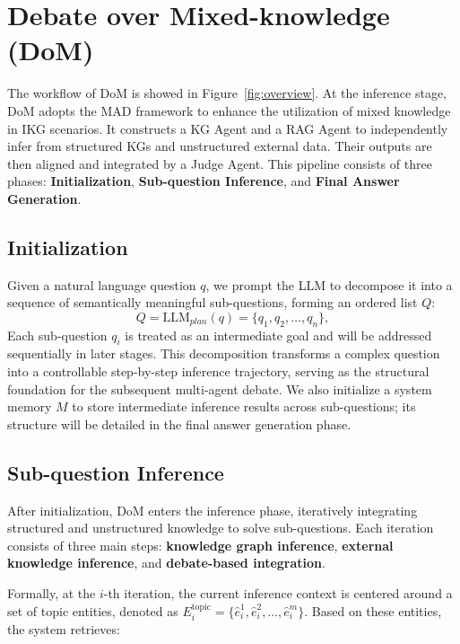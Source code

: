 


\section{Debate over Mixed-knowledge (DoM)} 

The workflow of DoM is showed in Figure~\ref{fig:overview}. At the inference stage, DoM adopts the MAD framework to enhance the utilization of mixed knowledge in IKG scenarios. It constructs a KG Agent and a RAG Agent to independently infer from structured KGs and unstructured external data. Their outputs are then aligned and integrated by a Judge Agent. This pipeline consists of three phases: \textbf{Initialization}, \textbf{Sub-question Inference}, and \textbf{Final Answer Generation}.

\subsection{Initialization}

Given a natural language question $q$, we prompt the LLM to decompose it into a sequence of semantically meaningful sub-questions, forming an ordered list $Q$:
\begin{equation}
Q = \text{LLM}_{plan}(q) = \{q_1, q_2, \dots, q_n\},
\end{equation}
Each sub-question $q_i$ is treated as an intermediate goal and will be addressed sequentially in later stages. This decomposition transforms a complex question into a controllable step-by-step inference trajectory, serving as the structural foundation for the subsequent multi-agent debate. We also initialize a system memory $M$ to store intermediate inference results across sub-questions; its structure will be detailed in the final answer generation phase.


\subsection{Sub-question Inference}
After initialization, DoM enters the inference phase, iteratively integrating structured and unstructured knowledge to solve sub-questions. Each iteration consists of three main steps: \textbf{knowledge graph inference}, \textbf{external knowledge inference}, and \textbf{debate-based integration}.

Formally, at the $i$-th iteration, the current inference context is centered around a set of topic entities, denoted as $E_{i}^{\text{topic}} = \{\hat{e}_{i}^1, \hat{e}_{i}^2, \dots, \hat{e}_{i}^m\}$. Based on these entities, the system retrieves:

